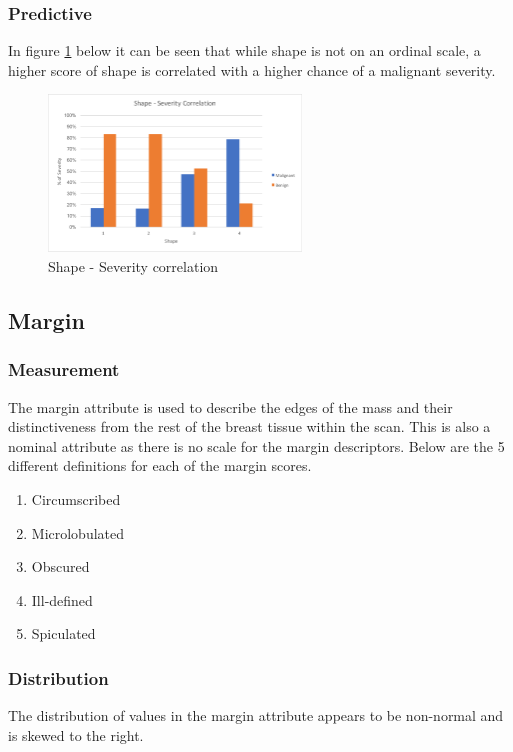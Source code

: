 \documentclass[12pt]{article}
\begin{document}
      \subsubsection{Predictive}
        In figure \ref{fig:shape-severity-correlation} below it can be seen that while shape is not on an ordinal scale, a higher score of shape is correlated with a higher chance of a malignant severity.

        \begin{figure}[H]
          \centering
          \includegraphics[width=0.6\textwidth]{shape-severity-correlation}
          \caption{Shape - Severity correlation}
          \label{fig:shape-severity-correlation}
        \end{figure}

    \subsection{Margin}
      \subsubsection{Measurement}
        The margin attribute is used to describe the edges of the mass and their distinctiveness from the rest of the breast tissue within the scan. This is also a nominal attribute as there is no scale for the margin descriptors. Below are the 5 different definitions for each of the margin scores.

        \singlespacing
        \begin{enumerate}[label=\arabic*)]
          \item Circumscribed
          \item Microlobulated
          \item Obscured
          \item Ill-defined
          \item Spiculated
        \end{enumerate}
        \doublespacing

      \subsubsection{Distribution}
        The distribution of values in the margin attribute appears to be non-normal and is skewed to the right.
\end{document}
